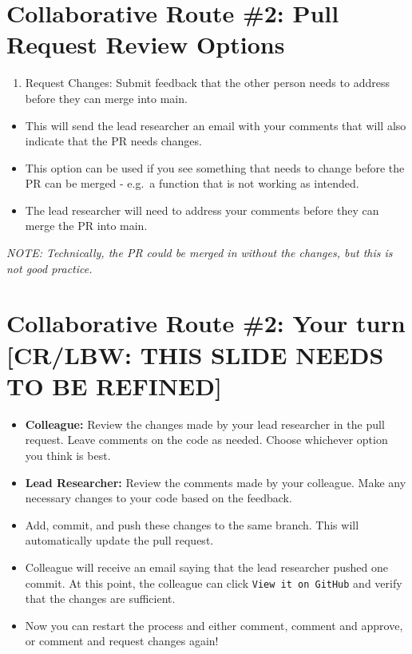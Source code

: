 \documentclass[
]{book}
\providecommand{\tightlist}{%
  \setlength{\itemsep}{0pt}\setlength{\parskip}{0pt}}
\begin{document}
\hypertarget{collaborative-route-2-pull-request-review-options-2}{%
\section{Collaborative Route \#2: Pull Request Review Options}\label{collaborative-route-2-pull-request-review-options-2}}

\begin{enumerate}
\def\labelenumi{\arabic{enumi}.}
\setcounter{enumi}{2}
\tightlist
\item
  Request Changes: Submit feedback that the other person needs to address before they can merge into main.
\end{enumerate}

\begin{itemize}
\tightlist
\item
  This will send the lead researcher an email with your comments that will also indicate that the PR needs changes.
\item
  This option can be used if you see something that needs to change before the PR can be merged - e.g.~a function that is not working as intended.
\item
  The lead researcher will need to address your comments before they can merge the PR into main.
\end{itemize}

\emph{NOTE: Technically, the PR could be merged in without the changes, but this is not good practice.}

\hypertarget{collaborative-route-2-your-turn-crlbw-this-slide-needs-to-be-refined}{%
\section{Collaborative Route \#2: Your turn {[}CR/LBW: THIS SLIDE NEEDS TO BE REFINED{]}}\label{collaborative-route-2-your-turn-crlbw-this-slide-needs-to-be-refined}}

\begin{itemize}
\tightlist
\item
  \textbf{Colleague:} Review the changes made by your lead researcher in the pull request. Leave comments on the code as needed. Choose whichever option you think is best.
\item
  \textbf{Lead Researcher:} Review the comments made by your colleague. Make any necessary changes to your code based on the feedback.
\item
  Add, commit, and push these changes to the same branch. This will automatically update the pull request.
\item
  Colleague will receive an email saying that the lead researcher pushed one commit. At this point, the colleague can click \texttt{View\ it\ on\ GitHub} and verify that the changes are sufficient.
\item
  Now you can restart the process and either comment, comment and approve, or comment and request changes again!
\end{itemize}
\end{document}
